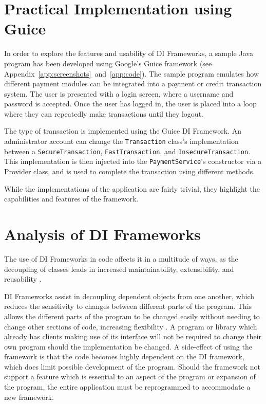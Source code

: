 \documentclass[12pt,twocolumn]{IEEEtran}
\begin{document}
\section{Practical Implementation using Guice}\label{sec:guice}

In order to explore the features and usability of DI Frameworks, a sample Java program has been developed using Google's Guice framework (see Appendix~\ref{app:screenshots}~and~\ref{app:code}). %
The sample program emulates how different payment modules can be integrated into a payment or credit transaction system. The user is presented with a login screen, where a username and password is accepted. Once the user has logged in, the user is placed into a loop where they can repeatedly make transactions until they logout. 

The type of transaction is implemented using the Guice DI Framework. An administrator account can change the \verb|Transaction| class's implementation between a \verb|SecureTransaction|, \verb|FastTransaction|, and \verb|InsecureTransaction|. This implementation is then injected into the \verb|PaymentService|'s constructor via a Provider class, and is used to complete the transaction using different methods. 


While the implementations of the application are fairly trivial, they highlight the capabilities and features of the framework.

\section{Analysis of DI Frameworks}\label{sec:analysis}

The use of DI Frameworks in code affects it in a multitude of ways, as the decoupling of classes leads in increased maintainability, extensibility, and reusability \cite{hongyulyangewantemperohaydenmelton2008,ekaterinarazinadavidjanzen2007}. 

DI Frameworks assist in decoupling dependent objects from one another, which reduces the sensitivity to changes between different parts of the program. This allows the different parts of the program to be changed easily without needing to change other sections of code, increasing flexibility \cite{ekaterinarazinadavidjanzen2007}. A program or library which already has clients making use of its interface will not be required to change their own program should the implementation be changed. A side-effect of using the framework is that the code becomes highly dependent on the DI framework, which does limit possible development of the program. Should the framework not support a feature which is essential to an aspect of the program or expansion of the program, the entire application must be reprogrammed to accommodate a new framework.
\end{document}
